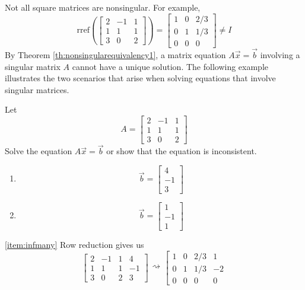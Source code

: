 \documentclass{ximera}
\begin{document}
Not all square matrices are nonsingular.  For example,
$$\mbox{rref}\left(\begin{bmatrix}2&-1&1\\1&1&1\\3&0&2\end{bmatrix}\right)=\begin{bmatrix}1&0&2/3\\0&1&1/3\\0&0&0\end{bmatrix}\neq I$$
By Theorem \ref{th:nonsingularequivalency1}, a matrix equation $A\vec{x}=\vec{b}$ involving a singular matrix $A$ cannot have a unique solution. The following example illustrates the two scenarios that arise when solving equations that involve singular matrices.
\begin{example}\label{ex:infinfeasible}
Let $$A=\begin{bmatrix}2&-1&1\\1&1&1\\3&0&2\end{bmatrix}$$  Solve the equation $A\vec{x}=\vec{b}$ or show that the equation is inconsistent.
\begin{enumerate}
    \item \label{item:infmany} $$\vec{b}=\begin{bmatrix}4\\-1\\3\end{bmatrix}$$
    \item \label{item:infeasible}
    $$\vec{b}=\begin{bmatrix}1\\-1\\1\end{bmatrix}$$
\end{enumerate}
\begin{explanation}
 \ref{item:infmany}  Row reduction gives us
 $$\left[\begin{array}{ccc|c}  
 2&-1&1&4\\1&1&1&-1\\3&0&2&3
 \end{array}\right]\begin{array}{c}
 \\
 \rightsquigarrow\\
 \\
 \end{array}\left[\begin{array}{ccc|c}  
 1&0&2/3&1\\0&1&1/3&-2\\0&0&0&0

\end{array}$$
\end{explanation}
\end{example}
\end{document}
